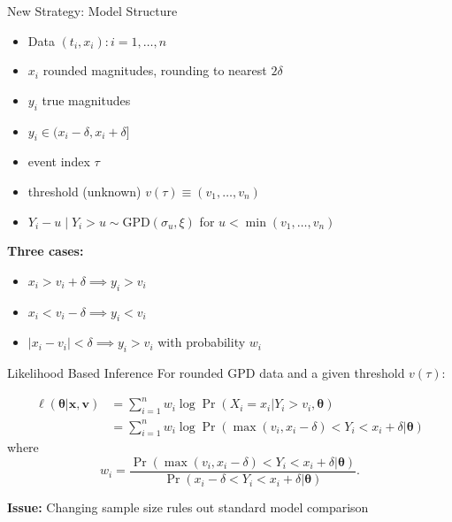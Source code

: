 \begin{frame}{New Strategy: Model Structure}
    \begin{itemize}
\item Data $(t_i,x_i): i=1,\ldots ,n$
\item $x_i$ rounded magnitudes, rounding to nearest $2\delta$
\item $y_i$ true magnitudes
\item $y_i\in (x_i-\delta, x_i+\delta]$
\item event index $\tau$
\item threshold (unknown) $v(\tau)\equiv (v_1, \ldots ,v_n)$ 
\item $Y_i-u\mid Y_i>u \sim \mbox{GPD}(\sigma_u,\xi)$ for $u<\min(v_1, \ldots ,v_n)$
\end{itemize}
\pause
\textbf{Three cases:}
\begin{itemize}
\item $x_i>v_i+\delta \implies y_i>v_i$
\item $x_i<v_i-\delta \implies y_i<v_i$
\item $\mid x_i-v_i\mid<\delta \implies y_i>v_i$  with probability $w_i$
\end{itemize}
\end{frame}

\begin{frame}{Likelihood Based Inference}
For rounded GPD data and a given threshold  $v(\tau)$:

\begin{align*} 
    \ell(\bm{\theta} | \bm{x}, \bm{v})
    &= \sum_{i = 1}^{n} w_i \log \Pr(X_i = x_i | Y_i > v_i, \bm{\theta}) \nonumber\\
    & = \sum_{i = 1}^{n} w_i \log \Pr( \max(v_i, x_i - \delta) < Y_i < x_i + \delta | \bm{\theta}) %
\end{align*}
where 
    \[
    w_i =  \frac{\Pr( \max(v_i, x_i - \delta) < Y_i < x_i + \delta | \bm{\theta})}{\Pr( x_i - \delta < Y_i < x_i + \delta | \bm{\theta})} . \]
 
\vspace{1em}  
\pause
\textbf{Issue:} Changing sample size rules out standard model comparison
\end{frame}

